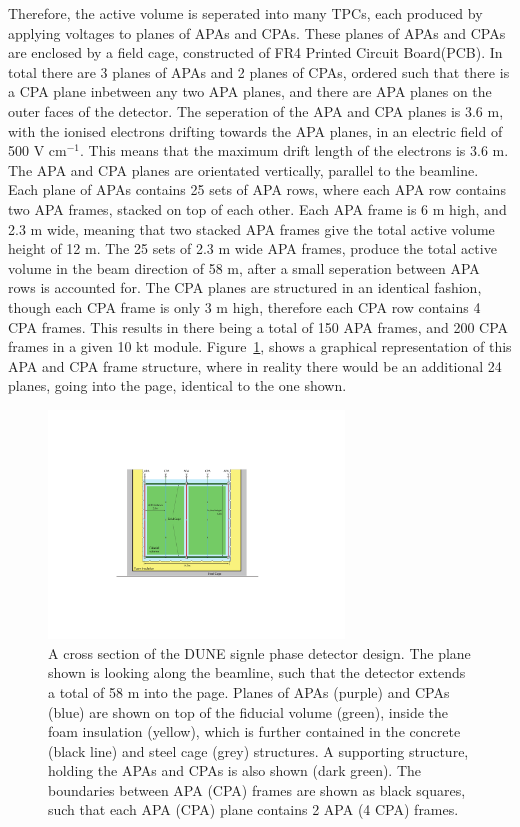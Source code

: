 Therefore, the active volume is seperated into many TPCs, each produced by applying voltages to planes of APAs and CPAs. These planes of APAs and CPAs are enclosed by a field cage, constructed of FR4 Printed Circuit Board(PCB). In total there are 3 planes of APAs and 2 planes of CPAs, ordered such that there is a CPA plane inbetween any two APA planes, and there are APA planes on the outer faces of the detector. The seperation of the APA and CPA planes is 3.6 m, with the ionised electrons drifting towards the APA planes, in an electric field of 500 V cm$^{-1}$. This means that the maximum drift length of the electrons is 3.6 m. The APA and CPA planes are orientated vertically, parallel to the beamline. Each plane of APAs contains 25 sets of APA rows, where each APA row contains two APA frames, stacked on top of each other. Each APA frame is 6 m high, and 2.3 m wide, meaning that two stacked APA frames give the total active volume height of 12 m. The 25 sets of 2.3 m wide APA frames, produce the total active volume in the beam direction of 58 m, after a small seperation between APA rows is accounted for. The CPA planes are structured in an identical fashion, though each CPA frame is only 3 m high, therefore each CPA row contains 4 CPA frames. This results in there being a total of 150 APA frames, and 200 CPA frames in a given 10 kt module. Figure~\ref{fig:DUNE_SP_Schem}, shows a graphical representation of this APA and CPA frame structure, where in reality there would be an additional 24 planes, going into the page, identical to the one shown. \\

\begin{figure}
  \centering
  \includegraphics[width=0.7\textwidth]{SinglePhase_CrossSec}
  \caption[A cross section of the DUNE signle phase detector design]
          {A cross section of the DUNE signle phase detector design. The plane shown is looking along the beamline, such that the detector extends a total of 58 m into the page. Planes of APAs (purple) and CPAs (blue) are shown on top of the fiducial volume (green), inside the foam insulation (yellow), which is further contained in the concrete (black line) and steel cage (grey) structures. A supporting structure, holding the APAs and CPAs is also shown (dark green). The boundaries between APA (CPA) frames are shown as black squares, such that each APA (CPA) plane contains 2 APA (4 CPA) frames.}
  \label{fig:DUNE_SP_Schem}
\end{figure}

